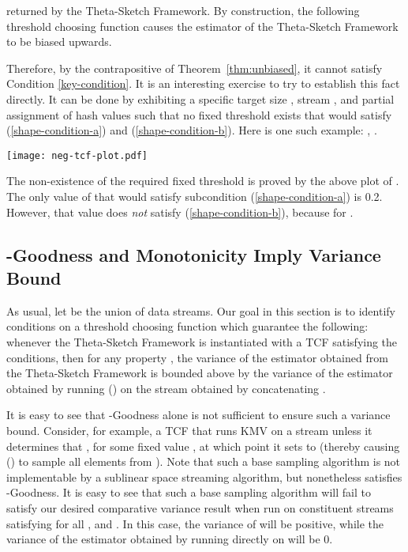 \documentclass{article}
\begin{document}
returned by the Theta-Sketch Framework. 
By construction, the following threshold choosing function causes the 
estimator of the Theta-Sketch Framework to be biased upwards. 

Therefore, by the contrapositive of Theorem~\ref{thm:unbiased},
it cannot satisfy Condition \ref{key-condition}. 
It is an interesting exercise to try to 
establish this fact directly. It can be done by exhibiting a specific
target size , stream , and partial assignment of hash values  
such that no fixed threshold  exists that would satisfy
(\ref{shape-condition-a}) and (\ref{shape-condition-b}). Here is one such 
example: , . 
\begin{center}
\texttt{[image: neg-tcf-plot.pdf]}
\end{center}
The non-existence of the required fixed threshold is proved
by the above plot of . The only
value of  that would satisfy subcondition (\ref{shape-condition-a}) is 0.2.
However, that value does {\em not} satisfy (\ref{shape-condition-b}), 
because  for .


\subsection{-Goodness and Monotonicity Imply Variance Bound}
\label{sec:variance}

As usual, let  be the union of  data streams. 
Our goal in this section is to identify conditions on a threshold choosing function which guarantee the following: whenever the Theta-Sketch Framework is instantiated with a TCF  satisfying the conditions,
then for any property , the variance  of the estimator obtained from the Theta-Sketch Framework
is bounded above by 
the variance of the estimator obtained by running () on the stream  obtained by concatenating . 

It is easy to see that -Goodness alone is not sufficient to ensure such a variance bound.
Consider, for example, a TCF  that runs KMV 
on a stream  unless it determines that , for some fixed value , at which point it sets  to  (thereby causing () to sample all elements from ). 
Note that such a base sampling algorithm is not implementable by a sublinear space streaming algorithm, but  nonetheless satisfies -Goodness.
It is easy to see that such a base sampling algorithm will fail to satisfy our desired comparative variance result when run on constituent streams  satisfying  for all , and . 
In this case, the variance of 
 will be positive, while the variance of the estimator obtained by running  directly on  will be 0. 
\end{document}
